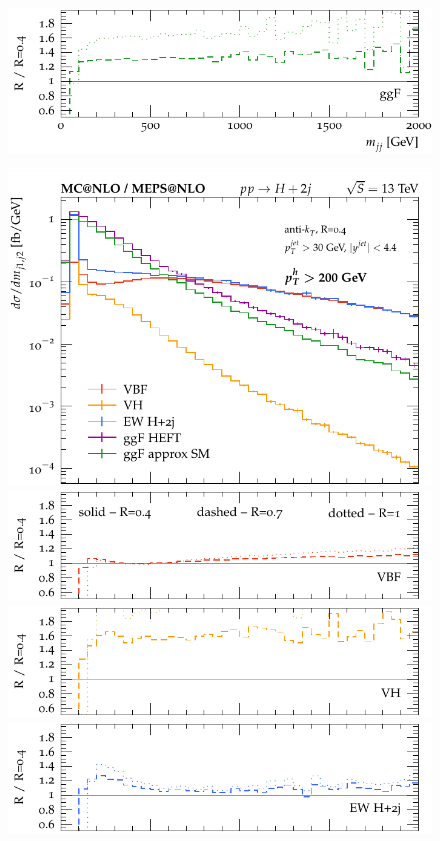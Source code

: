 \documentclass[10pt,prd,fleqn,superscriptaddress,notitlepage,nofootinbib,preprintnumbers,nobalancelastpage]{revtex4-1}
\begin{document}
\begin{figure}[p]
\begin{minipage}{.2925\textwidth}
    \includegraphics[width=\textwidth]{figures/channels/m_jj12_rGGH.pdf}
  \end{minipage}\hfill
  \begin{minipage}{.2925\textwidth}
    \includegraphics[width=\textwidth]{figures/channels/m_jj12_pth200.pdf}
    \includegraphics[width=\textwidth]{figures/channels/m_jj12_pth200_rVBF.pdf}
    \includegraphics[width=\textwidth]{figures/channels/m_jj12_pth200_rVH.pdf}
    \includegraphics[width=\textwidth]{figures/channels/m_jj12_pth200_rHJJ.pdf}

\end{minipage}
\end{figure}
\end{document}
